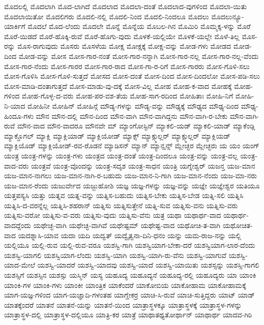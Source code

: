 {ಮೊದಲಲ್ಲಿ
ಮೊದಲಾಗಿ
ಮೊದ-ಲಾಗಿದೆ
ಮೊದಲಾದ
ಮೊದಲಾ-ದಂತೆ
ಮೊದಲಾದ-ವುಗಳಿಂದ
ಮೊದಲಾ-ಯಿತು
ಮೊದಲಾಯಿತೋ
ಮೊದಲಿಗರು
ಮೊದಲಿ-ನಲ್ಲಿ
ಮೊದಲಿ-ನಿಂದ
ಮೊದಲಿ-ನಿಂದಲೂ
ಮೊದಲು
ಮೊದಲುನ್ಯೂ-ಯಾರ್ಕಿಗೆ
ಮೊದಲೆ
ಮೊದ-ಲೆಂದು
ಮೊದಲೇ
ಮೊನ್ನೆ
ಮೊನ್ನೆಯ
ಮೊಬಲ-ಗಿನ
ಮೊಮಿರಿ
ಮೊಮ್ಮಕ್ಕ-ಳನ್ನು
ಮೊರೆ
ಮೊರೆ-ಯಿಡದೆ
ಮೊರೆ-ಹೊಕ್ಕಿ-ರುವೆ
ಮೊರೆ-ಹೊಗು-ವುದು
ಮೊಳಕೆ-ಯಲ್ಲಿಯೇ
ಮೊಳಕೆ-ಯಲ್ಲೇ
ಮೊಳೆ-ತಿಲ್ಲ
ಮೊಸ-ರನ್ನು
ಮೊಸ-ರಾಗುವುದು
ಮೊಸರು
ಮೊಸಳೆಯ
ಮೋಕ್ಷ
ಮೋಕ್ಷಕ್ಕೆ
ಮೋಕ್ಷ-ವನ್ನು
ಮೋಡ-ಗಳು
ಮೋಡದ
ಮೋಡ-ದಿಂದ
ಮೋಡ-ವನ್ನು
ಮೋಸ
ಮೋಸ-ಗಾರ-ನಂತೆ
ಮೋಸ-ಗಾರ-ನನ್ನಾಗಿ
ಮೋಸ-ಗಾರ-ನಲ್ಲ
ಮೋಸ-ಗಾರ-ನಲ್ಲ-ವೆಂದು
ಮೋಸ-ಗಾರ-ನೆಂದು
ಮೋಸ-ಗಾರರ
ಮೋಸ-ಗಾರ-ರಾದ
ಮೋಸ-ಗಾ-ರ-ರಿಗೆ
ಮೋಸ-ಗಾರರು
ಮೋಸ-ಗೊಳಿ-ಸಲು
ಮೋಸ-ಗೊಳಿಸಿ
ಮೋಸ-ಗೊಳಿ-ಸುತ್ತದೆ
ಮೋಸದ
ಮೋಸ-ದಂತೆ
ಮೋಸ-ದಿಂದ
ಮೋಸ-ದಿಂದಲೋ
ಮೋಸ-ಪಡಿ-ಸಲು
ಮೋಸ-ಮಾಡಿ-ದಂತಾಗುತ್ತದೆ
ಮೋಸ-ಮಾಡು-ವು-ದಕ್ಕೆ
ಮೋಸ-ವಿಲ್ಲ
ಮೋಹ
ಮೋಹ-ಕ-ವಾದ
ಮೋಹಕ್ಕೆ
ಮೋಹ-ಗಳಿಂದ
ಮೋಹ-ಗೊಳ್ಳ-ದ-ವರು
ಮೋಹ-ಪರ-ವಶ-ತೆಯ
ಮೋಹ-ಸಾಗ-ರದಿಂದ
ಮೋಹಿತಾಃ
ಮೋಹಿ-ನಿಗೆ
ಮೋಹಿ-ನಿ-ಯಾದ
ಮೋಹಿನೀ
ಮೋಹಿನ್
ಮೋಹಿನ್ಗೆ
ಮೌಡ್ಯ-ಗಳನ್ನು
ಮೌಡ್ಯ-ವನ್ನು
ಮೌಢ್ಯಕ್ಕೆ
ಮೌಢ್ಯದ
ಮೌಢ್ಯ-ದಿಂದ
ಮೌಢ್ಯ-ಹಿಂದೂ-ಗಳು
ಮೌನ
ಮೌನ-ದಲ್ಲಿ
ಮೌನ-ದಿಂದ
ಮೌನ-ವಾಗಿ
ಮೌನ-ವಾಗಿದ್ದನು
ಮೌನ-ವಾಗಿ-ರ-ಬೇಕು
ಮೌನ-ವಾಗಿ-ರುವೆ
ಮೌನ-ವಾದ
ಮೌನ-ವಾದರೂ
ಮೌನವೇ
ಮ್
ಮ್ಯಾಂಗೋಸ್ಟಿನ್
ಮ್ಯಾಕಲಿ-ಯಡ್
ಮ್ಯಾಕಲಿ-ಯಾಡ್
ಮ್ಯಾಕೆಂಡ್ಲಿ
ಮ್ಯಾಕ್ಡೊಗಲ್
ಮ್ಯಾಕ್ಲಿ
ಮ್ಯಾಕ್ಲಿಯಾಡ್
ಮ್ಯಾಕ್ಲಿಯೋಡ್
ಮ್ಯಾಕ್ಸ್
ಮ್ಯಾಕ್ಸ್ಮುಲ್ಲರ್
ಮ್ಯಾಕ್ಸ್ಮುಲ್ಲರ್
ಮ್ಯಾಕ್ಲಿಯಡ್
ಮ್ಯಾಕ್ಲಿಯೊಡ್
ಮ್ಯಾಕ್ಲಿಯೋಡ್-ರವ-ರೊಡನೆ
ಮ್ಯಾಡಿಸನ್
ಮ್ಯಾನ್
ಮ್ಯಾನ್ಷನ್ಸ್
ಮ್ಲೇಚ್ಛರ
ಮ್ಲೇಚ್ಛರು
ಯ
ಯಂ
ಯಂಗ್
ಯಂತ್ರ
ಯಂತ್ರ-ಗಳನ್ನು
ಯಂತ್ರ-ಗಳು
ಯಂತ್ರದ
ಯಂತ್ರ-ದಂತೆ
ಯಂತ್ರ-ದಿಂದಲೂ
ಯಂತ್ರ-ವನ್ನು
ಯಂತ್ರ-ವಲ್ಲ
ಯಂತ್ರ-ವಾದ-ವರು
ಯಂತ್ರವೆ
ಯಂತ್ರ-ವೊಂದನ್ನು
ಯಂತ್ರ-ಸದೃಶ
ಯಂತ್ರ-ಸಾಧನ
ಯಂತ್ರಿ
ಯಗ್ನೇಶ್ವರ್
ಯಜನ್ತ
ಯಜ-ಮಾನ
ಯಜ-ಮಾನ-ನಾಗಲು
ಯಜ-ಮಾನ-ನಾಗಿ-ರ-ಬಹುದು
ಯಜ-ಮಾನ-ನಿ-ಗಾಗಿ
ಯಜ-ಮಾನ-ನೆಂದು
ಯಜ-ಮಾ-ನರು
ಯಜ-ಮಾನ-ರೆಂದು
ಯಜುರ್ವೇದ
ಯಜ್ಜುಹೋಶಿ
ಯಜ್ಞ
ಯಜ್ಞ-ಗಳನ್ನು
ಯಜ್ಞ-ವನ್ನು
ಯಜ್ಞೇ
ಯಜ್ಞೇಶ್ವರ
ಯತಿಯೂ
ಯತ್ತಪಸ್ಯಸಿ
ಯತ್ತು
ಯತ್ನವ
ಯತ್ನ-ವನ್ನು
ಯತ್ನಿಸ-ಬಹುದು
ಯತ್ನಿಸ-ಬೇಕು
ಯತ್ನಿಸ-ಬೇಡ
ಯತ್ನಿ-ಸಲಿ
ಯತ್ನಿಸಿ
ಯತ್ನಿಸಿ-ದ-ವರನ್ನೆಲ್ಲ
ಯತ್ನಿಸಿ-ಶಹರಾನ್
ಯತ್ನಿಸು
ಯತ್ನಿಸುತ್ತೇನೆ
ಯತ್ನಿ-ಸುವ
ಯತ್ನಿಸು-ವನು
ಯತ್ನಿಸು-ವರು
ಯತ್ನಿಸು-ವರೋ
ಯತ್ನಿಸು-ವ-ವರು
ಯತ್ನಿಸು-ವುದು
ಯತ್ನಿಸು-ವೆನು
ಯತ್ರ
ಯಥಾ
ಯಥಾರ್ಥ-ವಾದ
ಯಥಾರ್ಥ-ವಾದದ್ದೆಂದು
ಯಥೇಚ್ಛ-ವಾಗಿ
ಯಥೇಚ್ಛ-ವಾಗಿವೆ
ಯಥೇಷ್ಟಮ್
ಯಥೇಷ್ಟ-ವಾದ
ಯಥೋಚಿ-ತ-ವಾಗಿ
ಯಥೋಚಿತ-ವಾದ
ಯದಶ್ನಾಸಿ-ಯಾವ
ಯದಾ
ಯದಿ
ಯದ್ವತ್
ಯದ್ವೈತ್ವನಾ-ದಿನಿ-ಧನಂ
ಯನ್ನು
ಯಮ-ರಾಜ-ನನ್ನು
ಯಲ್ಲಿ
ಯಲ್ಲಿಯೂ
ಯಲ್ಲಿ-ರುವ
ಯಲ್ಲಿ-ರುವ-ವರೂ
ಯಶಸ್ವಿ-ಗಾಗಿ
ಯಶಸ್ವಿಯಾಗ-ಬೇಕಾ-ದರೆ
ಯಶಸ್ವಿಯಾಗ-ಲಾರ-ದೆಂದು
ಯಶಸ್ವಿ-ಯಾಗಲಿ
ಯಶಸ್ವಿಯಾಗ-ಲೆಂದು
ಯಶಸ್ವಿ-ಯಾಗಿ
ಯಶಸ್ವಿ-ಯಾಗಿ-ರು-ವೆನು
ಯಶಸ್ವಿ-ಯಾಗುವೆ
ಯಶಸ್ವಿ-ಯಾದ-ಮೇಲೆ
ಯಶಸ್ವಿ-ಯಾದರೆ
ಯಶಸ್ವಿ-ಯಾದವು
ಯಶಸ್ವಿ-ಯಾದೆ
ಯಶಸ್ವಿ-ಯಾಯಿತು
ಯಶಸ್ಸನ್ನು
ಯಶಸ್ಸಿ-ಗಾಗಲಿ
ಯಶಸ್ಸಿಗೆ
ಯಶಸ್ಸಿನ
ಯಶಸ್ಸು
ಯಸ್ಮಿನ್
ಯಸ್ಯ
ಯಹೂದ್ಯ
ಯಹೂದ್ಯನೆ
ಯಹೂದ್ಯ-ರಲ್ಲಿ
ಯಹೂದ್ಯರು
ಯಾ
ಯಾಂಕಿ
ಯಾಂಕಿ-ಗಳ
ಯಾಂಕಿ-ಗಳು
ಯಾಂಕೀ
ಯಾಂತ್ರಿಕ
ಯಾಕೆಂದರೆ
ಯಾಕೋಬಿಯ
ಯಾಕೋಹಾಮ
ಯಾಕೋಹಾಮಕ್ಕೆ
ಯಾಗ-ಯಜ್ಞ-ಗಳಿಂದ
ಯಾಗ-ಯಜ್ಞಾದಿ-ಗಳಂತಹ
ಯಾಗ್ಡೇಕರ್ರ
ಯಾಚಿ-ಸಿ-ರುವೆ
ಯಾಚಿ-ಸುತ್ತಿದ್ದರು
ಯಾಟ್
ಯಾಡ್
ಯಾತಕ್ಕೆಂದರೆ
ಯಾತನೆ
ಯಾತನೆ-ಯನ್ನು
ಯಾತನೆ-ಯಿಂದ
ಯಾತ್ರಾಸ್ಥಳಕ್ಕೂ
ಯಾತ್ರಾಸ್ಥಳಕ್ಕೆ
ಯಾತ್ರಾಸ್ಥಳ-ಗಳನ್ನು
ಯಾತ್ರಾಸ್ಥಳ-ದಲ್ಲಿ
ಯಾತ್ರಾಸ್ಥಳ-ದಲ್ಲಿಯೂ
ಯಾತ್ರಿ-ಕರ
ಯಾತ್ರೆ
ಯಾಥಾತಥ್ಯತೋರ್ಥಾನ್
ಯಾಥಾರ್ಥ
ಯಾದವ-ಗಿರಿ
}
